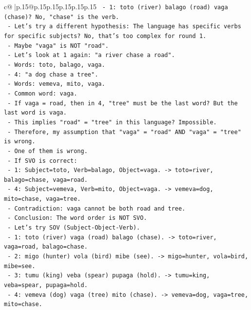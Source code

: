 \documentclass{article}
\begin{document}
{\begin{supertabular}{c@{$\;$}|p{.15\linewidth}@{}p{.15\linewidth}p{.15\linewidth}p{.15\linewidth}p{.15\linewidth}p{.15\linewidth}}
{{{\texttt{          {-} 1: toto (river) balago (road) vaga (chase)? No, "chase" is the verb.} \\
\texttt{        {-} Let's try a different hypothesis: The language has specific verbs for specific subjects? No, that's too complex for round 1.} \\
\texttt{        {-} Maybe "vaga" is NOT "road".} \\
\texttt{        {-} Let's look at 1 again: "a river chase a road".} \\
\texttt{        {-} Words: toto, balago, vaga.} \\
\texttt{        {-} 4: "a dog chase a tree".} \\
\texttt{        {-} Words: vemeva, mito, vaga.} \\
\texttt{        {-} Common word: vaga.} \\
\texttt{        {-} If vaga = road, then in 4, "tree" must be the last word? But the last word is vaga.} \\
\texttt{        {-} This implies "road" = "tree" in this language? Impossible.} \\
\texttt{        {-} Therefore, my assumption that "vaga" = "road" AND "vaga" = "tree" is wrong.} \\
\texttt{        {-} One of them is wrong.} \\
\texttt{        {-} If SVO is correct:} \\
\texttt{          {-} 1: Subject=toto, Verb=balago, Object=vaga. {-}> toto=river, balago=chase, vaga=road.} \\
\texttt{          {-} 4: Subject=vemeva, Verb=mito, Object=vaga. {-}> vemeva=dog, mito=chase, vaga=tree.} \\
\texttt{          {-} Contradiction: vaga cannot be both road and tree.} \\
\texttt{        {-} Conclusion: The word order is NOT SVO.} \\
\texttt{        {-} Let's try SOV (Subject{-}Object{-}Verb).} \\
\texttt{          {-} 1: toto (river) vaga (road) balago (chase). {-}> toto=river, vaga=road, balago=chase.} \\
\texttt{          {-} 2: migo (hunter) vola (bird) mibe (see). {-}> migo=hunter, vola=bird, mibe=see.} \\
\texttt{          {-} 3: tumu (king) veba (spear) pupaga (hold). {-}> tumu=king, veba=spear, pupaga=hold.} \\
\texttt{          {-} 4: vemeva (dog) vaga (tree) mito (chase). {-}> vemeva=dog, vaga=tree, mito=chase.} \\
}}}
\end{supertabular}}
\end{document}
